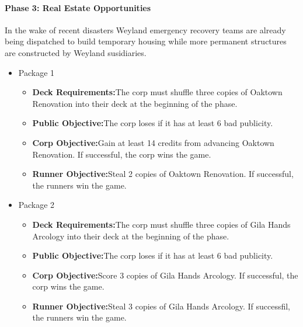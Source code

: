 \documentclass[titlepage]{article}
\begin{document}
			\paragraph{Phase 3: Real Estate Opportunities}

				In the wake of recent disasters Weyland emergency recovery teams are already being dispatched to build temporary housing while more permanent structures are constructed by Weyland susidiaries.

				\begin{itemize}

					\item Package 1

						\begin{itemize}

							\item \textbf{Deck Requirements:}The corp must shuffle three copies of Oaktown Renovation into their deck at the beginning of the phase.

							\item \textbf{Public Objective:}The corp loses if it has at least 6 bad publicity.

							\item \textbf{Corp Objective:}Gain at least 14 credits from advancing Oaktown Renovation. If successful, the corp wins the game.

							\item \textbf{Runner Objective:}Steal 2 copies of Oaktown Renovation. If successful, the runners win the game.

						\end{itemize}

					\item Package 2

						\begin{itemize}

							\item \textbf{Deck Requirements:}The corp must shuffle three copies of Gila Hands Arcology into their deck at the beginning of the phase.

							\item \textbf{Public Objective:}The corp loses if it has at least 6 bad publicity.

							\item \textbf{Corp Objective:}Score 3 copies of Gila Hands Arcology. If successful, the corp wins the game.

							\item \textbf{Runner Objective:}Steal 3 copies of Gila Hands Arcology. If successfil, the runners win the game.

						\end{itemize}

				\end{itemize}
\end{document}
